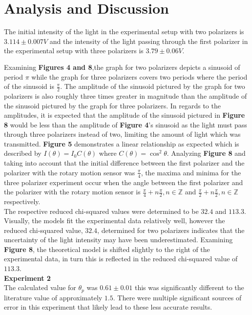 \documentclass[
	letterpaper, %
	10pt, %
]{CSUniSchoolLabReport}
\begin{document}
\section{Analysis and Discussion}
The initial intensity of the light in the experimental setup with two polarizers is $3.114 \pm 0.007 V$ and the intensity
of the light passing through the first polarizer in the experimental setup with three polarizers is $3.79 \pm 0.06 V$.

Examining \textbf{Figures 4 and 8},the graph for two polarizers depicts a sinusoid of period $\pi$ while the
graph for three polarizers covers two periods where the period of the sinusoid is $\frac{\pi}{2}$.
The amplitude of the sinusoid pictured by the graph for two polarizers is also roughly three times greater
in magnitude than the amplitude of the sinusoid pictured by the graph for three polarizers. In regards
to the amplitudes, it is expected that the amplitude of the sinusoid pictured in \textbf{Figure 8} would be less than the amplitude
of \textbf{Figure 4}'s sinusoid as the light must pass through three polarizers instead of two, limiting the amount of light which
was transmitted. \textbf{Figure 5} demonstrates a linear relationship as expected which is described by $I(\theta) = I_0C(\theta)$ where $C(\theta) = \cos^2\theta$.
Analyzing \textbf{Figure 8} and taking into account that the initial difference between the first polarizer and the
polarizer with the rotary motion sensor was $\frac{\pi}{4}$, the maxima and minima for the three polarizer experiment occur when the
angle between the first polarizer and the polarizer with the rotary motion sensor is $\frac{\pi}{4} + n\frac{\pi}{2}, n\in \mathbb{Z}$
and $\frac{\pi}{2}+n\frac{\pi}{2}, n\in\mathbb{Z}$ respectively.\\

The respective reduced chi-squared values were determined to be $32.4$ and $113.3$. Visually, the models fit the experimental
data relatively well, however the reduced chi-squared value, $32.4$, determined for two polarizers indicates that the uncertainty
of the light intensity may have been underestimated. Examining \textbf{Figure 8}, the theoretical model is shifted slightly to the
right of the experimental data, in turn this is reflected in the reduced chi-squared value of $113.3$.\\

\textbf{Experiment 2}\\
The calculated value for $\theta_p$ was $0.61\pm 0.01$ this was significantly different to the literature value of
approximately $1.5$. There were multiple significant sources of error in this experiment that likely lead to
these less accurate results. \\
\end{document}
